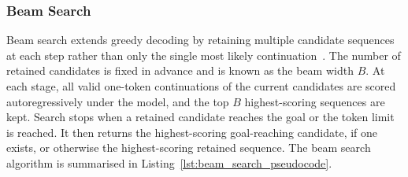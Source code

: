 ﻿\documentclass[12pt,a4paper]{article}
\let\oldcite\cite
\renewcommand{\cite}[1]{\mbox{\oldcite{#1}}}
\theoremstyle{definition}
\begin{document}
\subsubsection{Beam Search}

Beam search extends greedy decoding by retaining multiple candidate sequences at each step rather 
than only the single most likely continuation~\cite{jurafsky2026speech}. The number of retained 
candidates is fixed in advance and is known as the beam width $B$. At each stage, all valid one-token
continuations of the current candidates are scored autoregressively under the model, and the top $B$
highest-scoring sequences are kept. Search stops when a retained candidate reaches the goal or
the token limit is reached. It then returns the highest-scoring goal-reaching candidate, if one
exists, or otherwise the highest-scoring retained sequence.
The beam search algorithm is summarised in
Listing~\ref{lst:beam_search_pseudocode}. 
\end{document}
